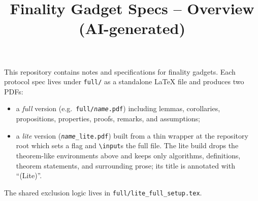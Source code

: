 \documentclass{article}
\title{Finality Gadget Specs -- Overview (AI-generated)}
\begin{document}
\maketitle

This repository contains notes and specifications for finality gadgets.
Each protocol spec lives under \texttt{full/} as a standalone \LaTeX{} file
and produces two PDFs:
\begin{itemize}
  \item a \emph{full} version (e.g.\ \texttt{full/\textit{name}.pdf}) including
    lemmas, corollaries, propositions, properties, proofs, remarks, and
    assumptions;
  \item a \emph{lite} version (\texttt{\textit{name}\_lite.pdf}) built from a
    thin wrapper at the repository root which sets a flag and \texttt{\textbackslash input}s the full
    file. The lite build drops the theorem-like environments above and keeps
    only algorithms, definitions, theorem statements, and surrounding prose;
    its title is annotated with ``(Lite)''.
\end{itemize}
The shared exclusion logic lives in \texttt{full/lite\_full\_setup.tex}.
\end{document}
